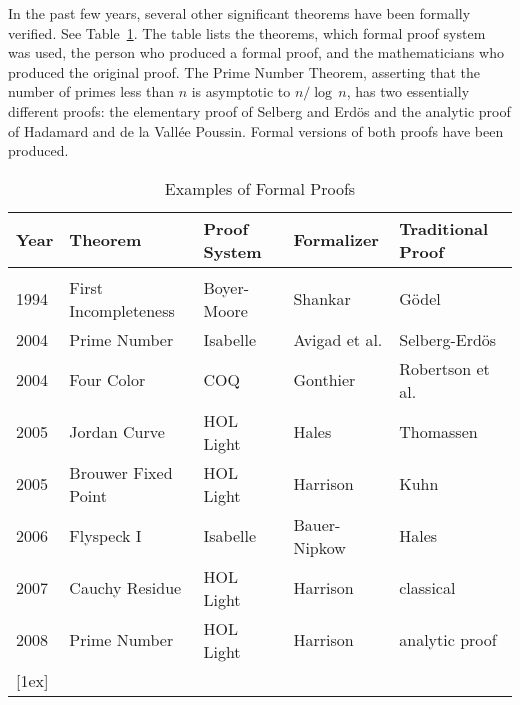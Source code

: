 \documentclass{llncs}
\begin{document}
In the past few years, several other significant theorems have been
formally verified. See Table~\ref{table}.  The table lists the
theorems, which formal proof system was used, the person who
produced a formal proof, and the mathematicians who produced the
original proof.  The Prime Number Theorem, asserting that the
number of primes less than $n$ is asymptotic to $n/\log\,n$, has
two essentially different proofs: the elementary proof of
Selberg and Erd\"os and the analytic proof of Hadamard and
de la Vall\'ee Poussin.  Formal versions of both proofs have
been produced.



\smallskip

\begin{table}[ht]
\caption{Examples of Formal Proofs}
\centering
\begin{tabular}{l l l l l}
\hline
Year\hspace{0.5em} & Theorem\hspace{6em} & Proof System\hspace{2em}  & Formalizer\hspace{3em} & Traditional Proof\\ [0.5ex]
\hline \\
1994 & First Incompleteness & Boyer-Moore   & Shankar &  G\"odel \\
2004 & Prime Number & Isabelle & Avigad et al. & Selberg-Erd\"os\\
2004 & Four Color & COQ & Gonthier & Robertson et al.\\
2005 & Jordan Curve  & HOL Light & Hales & Thomassen \\
2005 & Brouwer Fixed Point & HOL Light & Harrison & Kuhn \\
2006 & Flyspeck I & Isabelle & Bauer-Nipkow & Hales \\
2007 & Cauchy Residue & HOL Light & Harrison & classical \\
2008 & Prime Number & HOL Light & Harrison & analytic proof \\
 [1ex]
\hline
\end{tabular}
\label{table}
\end{table}
\end{document}
